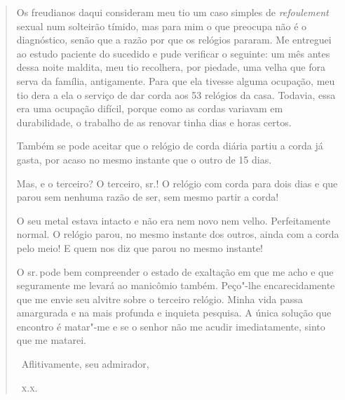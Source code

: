 \begin{quote}

Os freudianos daqui consideram meu tio um caso simples de
\emph{refoulement} sexual num solteirão tímido, mas para mim o que preocupa
não é o diagnóstico, senão que a razão por que os relógios pararam. Me
entreguei ao estudo paciente do sucedido e pude verificar o seguinte: um
mês antes dessa noite maldita, meu tio recolhera, por piedade, uma velha
que fora serva da família, antigamente. Para que ela tivesse alguma
ocupação, meu tio dera a ela o serviço de dar corda aos 53 relógios da
casa. Todavia, essa era uma ocupação difícil, porque como as cordas
variavam em durabilidade, o trabalho de as renovar tinha dias e horas
certos.


Também se pode aceitar que o relógio de corda diária partiu a corda já
gasta, por acaso no mesmo instante que o outro de 15 dias.

Mas, e o terceiro? O terceiro, sr.! O relógio com corda para dois dias
e que parou sem nenhuma razão de ser, sem mesmo partir a corda!

O seu metal estava intacto e não era nem novo nem velho. Perfeitamente
normal. O relógio parou, no mesmo instante dos outros, ainda com a corda
pelo meio! E quem nos diz que parou no mesmo instante!


O sr.\,pode bem compreender o estado de exaltação em que me acho e que
seguramente me levará ao manicômio também. Peço"-lhe encarecidamente que
me envie seu alvitre sobre o terceiro relógio. Minha vida passa
amargurada e na mais profunda e inquieta pesquisa. A única solução que
encontro é matar"-me e se o senhor não me acudir imediatamente, sinto que
me matarei.

\hfill\ Aflitivamente, seu admirador,

\hfill\ \textsc{x.x.}
\end{quote}

